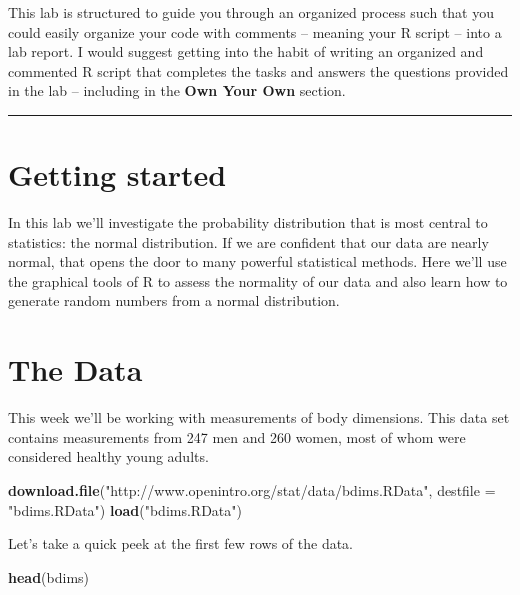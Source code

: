 \documentclass[]{book}
\newenvironment{Shaded}{\begin{snugshade}}{\end{snugshade}}
\newcommand{\DataTypeTok}[1]{\textcolor[rgb]{0.13,0.29,0.53}{#1}}
\newcommand{\KeywordTok}[1]{\textcolor[rgb]{0.13,0.29,0.53}{\textbf{#1}}}
\newcommand{\NormalTok}[1]{#1}
\newcommand{\StringTok}[1]{\textcolor[rgb]{0.31,0.60,0.02}{#1}}
\theoremstyle{definition}
\theoremstyle{definition}
\theoremstyle{definition}
\theoremstyle{remark}
\begin{document}
This lab is structured to guide you through an organized process such
that you could easily organize your code with comments -- meaning your R
script -- into a lab report. I would suggest getting into the habit of
writing an organized and commented R script that completes the tasks and
answers the questions provided in the lab -- including in the
\textbf{Own Your Own} section.

\begin{center}\rule{0.5\linewidth}{\linethickness}\end{center}

\hypertarget{getting-started-1}{%
\section{Getting started}\label{getting-started-1}}

In this lab we'll investigate the probability distribution that is most
central to statistics: the normal distribution. If we are confident that
our data are nearly normal, that opens the door to many powerful
statistical methods. Here we'll use the graphical tools of R to assess
the normality of our data and also learn how to generate random numbers
from a normal distribution.

\hypertarget{the-data}{%
\section{The Data}\label{the-data}}

This week we'll be working with measurements of body dimensions. This
data set contains measurements from 247 men and 260 women, most of whom
were considered healthy young adults.

\begin{Shaded}
\begin{Highlighting}[]
\KeywordTok{download.file}\NormalTok{(}\StringTok{"http://www.openintro.org/stat/data/bdims.RData"}\NormalTok{, }\DataTypeTok{destfile =} \StringTok{"bdims.RData"}\NormalTok{)}
\KeywordTok{load}\NormalTok{(}\StringTok{"bdims.RData"}\NormalTok{)}
\end{Highlighting}
\end{Shaded}

Let's take a quick peek at the first few rows of the data.

\begin{Shaded}
\begin{Highlighting}[]
\KeywordTok{head}\NormalTok{(bdims)}
\end{Highlighting}
\end{Shaded}
\end{document}
